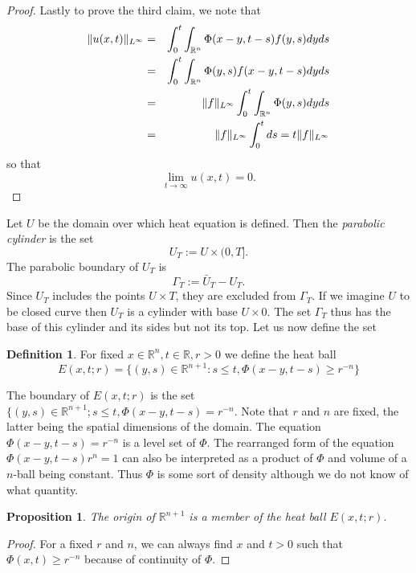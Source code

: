 \documentclass{article}
\DeclarePairedDelimiter\norm{\lVert}{\rVert}
\theoremstyle{plain}
\numberwithin{thm}{section}
\theoremstyle{plain}
\newtheorem{prop}{Proposition}
\numberwithin{prop}{section}
\theoremstyle{definition}
\newtheorem{defn}{Definition}
\numberwithin{defn}{section}
\theoremstyle{remark}
\numberwithin{equation}{section}
\begin{document}
\begin{proof}
Lastly to prove the third claim, we note that
\begin{eqnarray*}
\norm{u(x, t)}_{L^\infty} &=& \int_0^t\int_{\mathbb{R}^n}\Phi(x - y,t - s)f(y, s)dyds \\
&=& \int_0^t\int_{\mathbb{R}^n}\Phi(y, s)f(x - y, t - s)dyds \\
&=& \norm{f}_{L^\infty}\int_0^t\int_{\mathbb{R}^n}\Phi(y, s)dyds \\
&=& \norm{f}_{L^\infty}\int_0^tds = t\norm{f}_{L^\infty}
\end{eqnarray*}
so that
\[
\lim_{t \rightarrow \infty}u(x, t) = 0.
\]
\end{proof}

Let $U$ be the domain over which heat equation is defined. Then the \emph{parabolic cylinder} is the set
\begin{equation}\label{s27e21}
U_T := U \times (0, T].
\end{equation}
The parabolic boundary of $U_T$ is
\begin{equation}\label{s27e22}
\Gamma_T := \bar{U}_T - U_T.
\end{equation}
Since $U_T$ includes the points $U \times {T}$, they are excluded from $\Gamma_T$. If we imagine $U$ to be closed
curve then $U_T$ is a cylinder with base $U \times {0}$. The set $\Gamma_T$ thus has the base of this cylinder and
its sides but not its top. Let us now define the set
\begin{defn}
For fixed $x \in \mathbb{R}^n, t \in \mathbb{R}, r > 0$ we define the heat ball
\[
E(x, t; r) = \{(y, s) \in \mathbb{R}^{n+1}: s \le t, \Phi(x - y, t - s) \ge r^{-n}\}
\]
\end{defn}
The boundary of $E(x, t; r)$ is the set $\{(y, s) \in \mathbb{R}^{n+1}; s \le t, \Phi(x - y,t - s) = r^{-n}$. Note 
that $r$ and $n$ are fixed, the latter being the spatial dimensions of the domain. The equation $\Phi(x - y, t - s)
= r^{-n}$ is a level set of $\Phi$. The rearranged form of the equation $\Phi(x - y, t - s)r^n = 1$ can also be
interpreted as a product of $\Phi$ and volume of a $n$-ball being constant. Thus $\Phi$ is some sort of density
although we do not know of what quantity.

\begin{prop}\label{s27p4}
The origin of $\mathbb{R}^{n+1}$ is a member of the heat ball $E(x, t; r)$.
\end{prop}
\begin{proof}
For a fixed $r$ and $n$, we can always find $x$ and $t > 0$ such that $\Phi(x, t) \ge r^{-n}$ because of continuity
of $\Phi$.
\end{proof}
\end{document}

